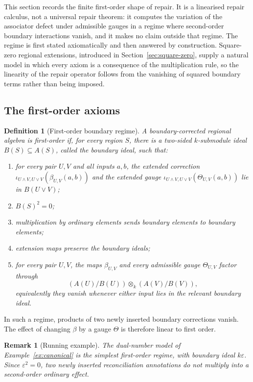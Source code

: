 \documentclass[11pt]{article}
\newtheorem{definition}[theorem]{Definition}
\newtheorem{remark}[theorem]{Remark}
\begin{document}
This section records the finite first-order shape of repair. It is a linearised repair calculus, not a universal repair theorem: it computes the variation of the associator defect under admissible gauges in a regime where second-order boundary interactions vanish, and it makes no claim outside that regime. The regime is first stated axiomatically and then answered by construction. Square-zero regional extensions, introduced in Section~\ref{sec:square-zero}, supply a natural model in which every axiom is a consequence of the multiplication rule, so the linearity of the repair operator follows from the vanishing of squared boundary terms rather than being imposed.

\subsection{The first-order axioms}

\begin{definition}[First-order boundary regime]
A boundary-corrected regional algebra is first-order if, for every region \(S\), there is a two-sided \(k\)-submodule ideal \(B(S)\subseteq A(S)\), called the boundary ideal, such that:

\begin{enumerate}[label=(\roman*)]
\item for every pair \(U,V\) and all inputs \(a,b\), the extended correction \(\iota_{U\wedge V,U\vee V}(\beta_{U,V}(a,b))\) and the extended gauge \(\iota_{U\wedge V,U\vee V}(\Theta_{U,V}(a,b))\) lie in \(B(U\vee V)\);
\item \(B(S)^2=0\);
\item multiplication by ordinary elements sends boundary elements to boundary elements;
\item extension maps preserve the boundary ideals;
\item for every pair \(U,V\), the maps \(\beta_{U,V}\) and every admissible gauge \(\Theta_{U,V}\) factor through
\[
(A(U)/B(U))\otimes_k(A(V)/B(V)),
\]
equivalently they vanish whenever either input lies in the relevant boundary ideal.
\end{enumerate}
\end{definition}

In such a regime, products of two newly inserted boundary corrections vanish. The effect of changing \(\beta\) by a gauge \(\Theta\) is therefore linear to first order.

\begin{remark}[Running example]
The dual-number model of Example~\ref{ex:canonical} is the simplest first-order regime, with boundary ideal \(k\varepsilon\). Since \(\varepsilon^2=0\), two newly inserted reconciliation annotations do not multiply into a second-order ordinary effect.
\end{remark}
\end{document}
